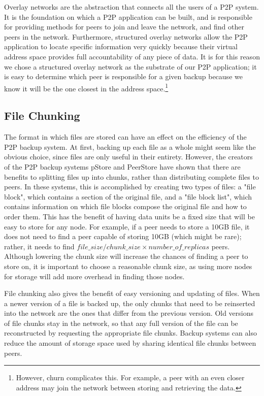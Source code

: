 \documentclass[12pt]{report}
\begin{document}
Overlay networks are the abstraction that connects all the users of a P2P system. It is the foundation on which a P2P application can be built, and is responsible for providing methods for peers to join and leave the network, and find other peers in the network. Furthermore, structured overlay networks allow the P2P application to locate specific information very quickly because their virtual address space provides full accountability of any piece of data. It is for this reason we chose a structured overlay network as the substrate of our P2P application; it is easy to determine which peer is responsible for a given backup because we know it will be the one closest in the address space.\footnote{However, churn complicates this. For example, a peer with an even closer address may join the network between storing and retrieving the data.}


\subsection{File Chunking} \label{sec:filechunking}
The format in which files are stored can have an effect on the efficiency of the P2P backup system. At first, backing up each file as a whole might seem like the obvious choice, since files are only useful in their entirety. However, the creators of the P2P backup systems pStore \cite{pStore} and PeerStore \cite{PeerStore} have shown that there are benefits to splitting files up into chunks, rather than distributing complete files to peers. In these systems, this is accomplished by creating two types of files: a "file block", which contains a section of the original file, and a "file block list", which contains information on which file blocks compose the original file and how to order them. This has the benefit of having data units be a fixed size that will be easy to store for any node. For example, if a peer needs to store a 10GB file, it does not need to find a peer capable of storing 10GB (which might be rare); rather, it needs to find $file\_size/chunk\_size \times number\_of\_replicas$ peers. Although lowering the chunk size will increase the chances of finding a peer to store on, it is important to choose a reasonable chunk size, as using more nodes for storage will add more overhead in finding those nodes.

File chunking also gives the benefit of easy versioning and updating of files. When a newer version of a file is backed up, the only chunks that need to be reinserted into the network are the ones that differ from the previous version. Old versions of file chunks stay in the network, so that any full version of the file can be reconstructed by requesting the appropriate file chunks. Backup systems can also reduce the amount of storage space used by sharing identical file chunks between peers.
\end{document}
